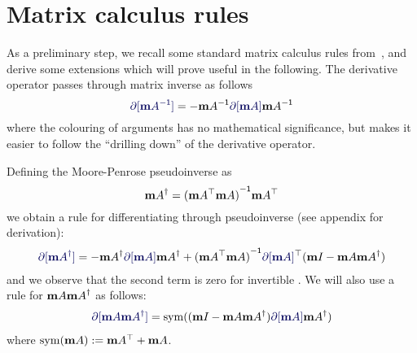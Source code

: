 \documentclass[runningheads]{llncs}
\def\eqlabel#1{\label{eq:#1}}
\def\tr{^\top}
\begin{document}

\section{Matrix calculus rules}
As a preliminary step, we recall some standard matrix calculus rules from~\cite{minka00}, and derive some extensions which will prove useful in the following.   The derivative operator passes through matrix inverse as follows
\begin{equation}
\diff[\inv \mA] = -\inv \mA \diff[\mA] \inv \mA
\end{equation}
where the colouring of arguments has no mathematical significance, but makes it easier to follow the ``drilling down'' of the derivative operator.  

Defining the Moore-Penrose pseudoinverse as
\begin{equation}
\pinv \mA = \inv{(\mA\tr \mA)}\mA\tr
\end{equation}
we obtain a rule for differentiating through pseudoinverse (see appendix for derivation):
\begin{align}
\diff[\pinv \mA] = -\pinv \mA \diff[\mA] \pinv \mA +
\inv{(\mA\tr\mA)}\diff[\mA]\tr(\Id{}-\mA\pinv\mA)
\end{align}
and we observe that the second term is zero for invertible \mA.  We will also use a rule for $\mathbf m A {{\mathbf m A}^\dagger}$ as follows:
\begin{align}
\diff[\mA \pinv \mA] = \sym((\Id{} - \mA\pinv \mA) \diff[\mA] \pinv \mA)
\end{align}
where $\sym(\mA) := \mA\tr + \mA$. 

\end{document}
